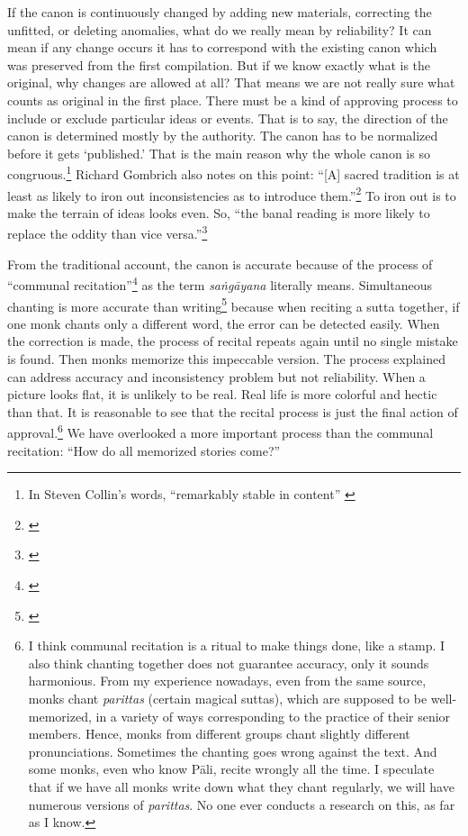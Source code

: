 If the canon is continuously changed by adding new materials, correcting the unfitted, or deleting anomalies, what do we really mean by reliability? It can mean if any change occurs it has to correspond with the existing canon which was preserved from the first compilation. But if we know exactly what is the original, why changes are allowed at all? That means we are not really sure what counts as original in the first place. There must be a kind of approving process to include or exclude particular ideas or events. That is to say, the direction of the canon is determined mostly by the authority. The canon has to be normalized before it gets `published.' That is the main reason why the whole canon is so congruous.\footnote{In Steven Collin's words, ``remarkably stable in content'' \citeyearpar[p.~41]{collins:nirvana}} Richard Gombrich also notes on this point: ``[A] sacred tradition is at least as likely to iron out inconsistencies as to introduce them.''\footnote{\citealp[p.~11; see also p.~19]{gombrich:how}} To iron out is to make the terrain of ideas looks even. So, ``the banal reading is more likely to replace the oddity than vice versa.''\footnote{\citealp[pp.~11--2]{gombrich:how}}

From the traditional account, the canon is accurate because of the process of ``communal recitation''\footnote{\citealp[pp.~13--4]{payutto:canon}} as the term \emph{sa\.ng\=ayana} literally means. Simultaneous chanting is more accurate than writing\footnote{\citealp[p.~22]{payutto:canon}} because when reciting a sutta together, if one monk chants only a different word, the error can be detected easily. When the correction is made, the process of recital repeats again until no single mistake is found. Then monks memorize this impeccable version. The process explained can address accuracy and inconsistency problem but not reliability. When a picture looks flat, it is unlikely to be real. Real life is more colorful and hectic than that. It is reasonable to see that the recital process is just the final action of approval.\footnote{I think communal recitation is a ritual to make things done, like a stamp. I also think chanting together does not guarantee accuracy, only it sounds harmonious. From my experience nowadays, even from the same source, monks chant \textit{parittas} (certain magical suttas), which are supposed to be well-memorized, in a variety of ways corresponding to the practice of their senior members. Hence, monks from different groups chant slightly different pronunciations. Sometimes the chanting goes wrong against the text. And some monks, even who know P\=ali, recite wrongly all the time. I speculate that if we have all monks write down what they chant regularly, we will have numerous versions of \textit{parittas}. No one ever conducts a research on this, as far as I know.} We have overlooked a more important process than the communal recitation: ``How do all memorized stories come?''

